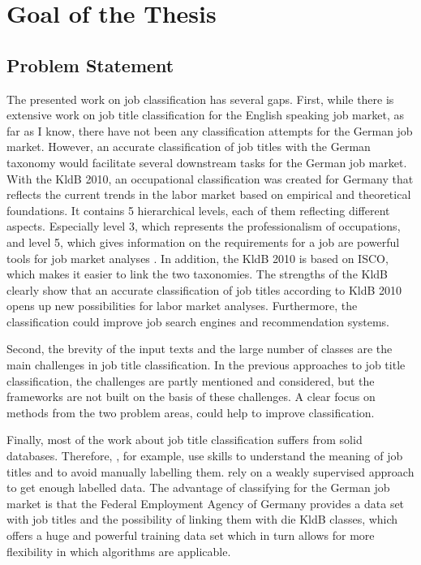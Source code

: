 \documentclass[a4paper]{article}
\begin{document}
\section{Goal of the Thesis}
\subsection{Problem Statement}
The presented work on job classification has several gaps. First, while there is extensive work on job title classification for the English speaking job market, as far as I know, there have not been any classification attempts for the German job market. However, an accurate classification of job titles with the German taxonomy would facilitate several downstream tasks for the German job market. With the KldB 2010, an occupational classification was created for Germany that reflects the current trends in the labor market based on empirical and theoretical foundations. It contains 5 hierarchical levels, each of them reflecting different aspects. Especially level 3, which represents the professionalism of occupations, and level 5, which gives information on the requirements for a job are powerful tools for job market analyses \citep{Paulus2013}. In addition, the KldB 2010 is based on ISCO, which makes it easier to link the two taxonomies. The strengths of the KldB clearly show that an accurate classification of job titles according to KldB 2010 opens up new possibilities for labor market analyses. Furthermore, the classification could improve job search engines and recommendation systems. 

Second, the brevity of the input texts and the large number of classes are the main challenges in job title classification. In the previous approaches to job title classification, the challenges are partly mentioned and considered, but the frameworks are not built on the basis of these challenges. A clear focus on methods from the two problem areas, could help to improve classification.  

Finally, most of the work about job title classification suffers from solid databases. Therefore, \cite{Decorte2021}, for example, use skills to understand the meaning of job titles and to avoid manually labelling them. \cite{Javed2015} rely on a weakly supervised approach to get enough labelled data. The advantage of classifying for the German job market is that the Federal Employment Agency of Germany provides a data set with job titles and the possibility of linking them with die KldB classes, which offers a huge and powerful training data set which in turn allows for more flexibility in which algorithms are applicable.
\end{document}
